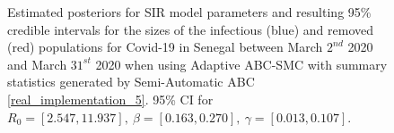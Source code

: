 \documentclass[11pt,a4paper]{article}
\theoremstyle{break}
\begin{document}
  \begin{figure}[H]
    \centering
    \caption{Estimated posteriors for SIR model parameters and resulting 95\% credible intervals for the sizes of the infectious (blue) and removed (red) populations for Covid-19 in Senegal between March $2^{nd}$ 2020 and March $31^{st}$ 2020 when using Adaptive ABC-SMC with summary statistics generated by Semi-Automatic ABC \ref{real_implementation_5}. 95\% CI for $R_0=[2.547,11.937],\ \beta=[0.163,0.270],\ \gamma=[0.013,0.107]$.}
    \label{fig_senegal_semi_auto}
  \end{figure}
\end{document}

